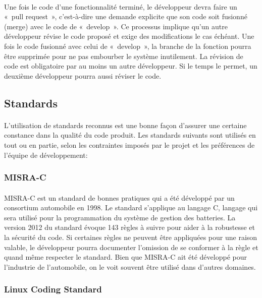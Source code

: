 	\paragraph{}
	Une fois le code d’une fonctionnalité terminé, le développeur devra faire un « pull request », c’est-à-dire une demande explicite que son code soit fusionné (merge) avec le code de « develop ». Ce processus implique qu’un autre développeur révise le code proposé et exige  des modifications le cas échéant. Une fois le code fusionné avec celui de « develop », la branche de la fonction pourra être supprimée pour ne pas embourber le système inutilement. La révision de code est obligatoire par au moins un autre développeur. Si le temps le permet, un deuxième développeur pourra aussi réviser le code.

	\subsection{Standards}
	\paragraph{}
	L’utilisation de standards reconnus est une bonne façon d’assurer une certaine constance dans la qualité du code produit. Les standards suivants sont utilisés en tout ou en partie, selon les contraintes imposés par le projet et les préférences de l’équipe de développement:

		\subsubsection{MISRA-C}
		\paragraph{}
		MISRA-C est un standard de bonnes pratiques qui a été développé par un consortium automobile en 1998. Le standard s’applique au langage C, langage qui sera utilisé pour la programmation du système de gestion des batteries. La version 2012 du standard évoque 143 règles à suivre pour aider à la robustesse et la sécurité du code. Si certaines règles ne peuvent être appliquées pour une raison valable, le développeur pourra documenter l’omission de se conformer à la règle et quand même respecter le standard. Bien que MISRA-C ait été développé pour l’industrie de l’automobile, on le voit souvent être utilisé dans d’autres domaines.

		\subsubsection{Linux Coding Standard}
